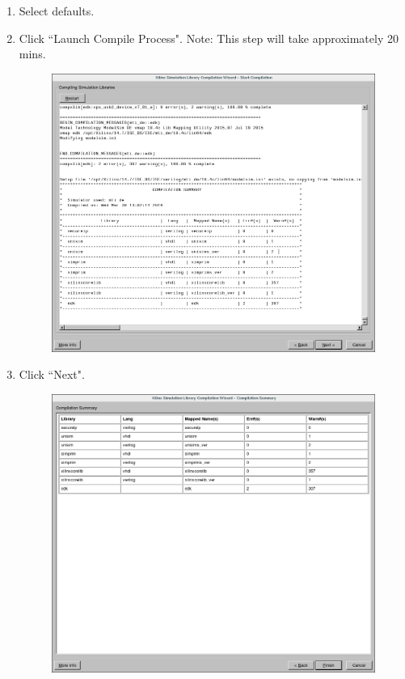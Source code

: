 \begin{flushleft}
\begin{enumerate}
		\item Select defaults.
		\item Click ``Launch Compile Process".
			\subitem Note: This step will take approximately 20 mins.

	\begin{figure}[H]
	\centering\captionsetup{type=figure}\includegraphics[scale=0.5]{Xilinx_CompXLib_6_CompilationLog}
		\label{fig:wizard_page_6}
	\end{figure}

		\item Click ``Next".

	\begin{figure}[H]
	\centering\captionsetup{type=figure}\includegraphics[scale=0.5]{Xilinx_CompXLib_7_CompilationSummary}
		\label{fig:wizard_page_7}
	\end{figure}



\end{enumerate}
\end{flushleft}
